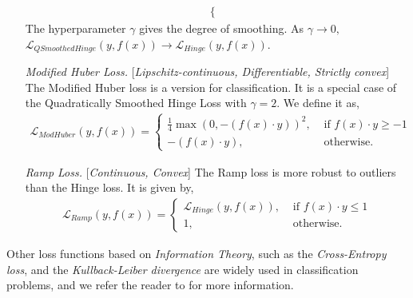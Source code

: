\documentclass[nobib]{tufte-handout} %
\begin{document}
\begin{enumerate}
\begin{equation}
\begin{split}
\begin{cases}
        \end{cases}
      \end{split}
    \end{equation}
    The hyperparameter $\gamma$ gives the degree of smoothing. As $\gamma \to 0,$  $\mathcal{L}_{QSmoothedHinge}(y, f(x)) \to \mathcal{L}_{Hinge}(y, f(x)) $.
    \item[\it Modified Huber Loss.][\textit{Lipschitz-continuous, Differentiable, Strictly convex}] The Modified Huber loss is a version for classification. It is a special case of the Quadratically Smoothed Hinge Loss with $\gamma =2$. We define it as,
\begin{equation}
      \begin{split}
        \mathcal{L}_{ModHuber}(y, f(x)) = 
        \begin{cases}
          \frac{1}{4} \max (0, -(f(x) \cdot y))^2 , &\text{ if } f(x)\cdot y \geq -1 \\
         -(f(x) \cdot y), &\text{ otherwise.}  
        \end{cases}
      \end{split}
    \end{equation}
    \item[\it Ramp Loss.][\textit{Continuous, Convex}] The Ramp loss is more robust to outliers than the Hinge loss. It is given by,
    \begin{equation}
      \begin{split}
        \mathcal{L}_{Ramp}(y, f(x)) = 
        \begin{cases}
         \mathcal{L}_{Hinge}(y, f(x)), &\text{ if } f(x)\cdot y \leq 1 \\
         1, &\text{ otherwise.}  
        \end{cases}
      \end{split}
    \end{equation}
  \end{enumerate}
Other loss functions based on \textit{Information Theory}, such as the \textit{Cross-Entropy loss}, and the \textit{Kullback-Leiber divergence} are widely used in classification problems, and we refer the reader to \citep{ciampiconi2023survey} for more information.
\end{document}
